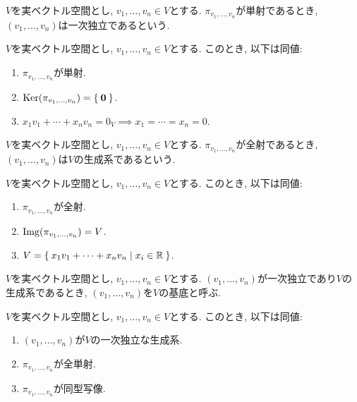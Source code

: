 \begin{definition}
  $V$を実ベクトル空間とし,
  $v_1,\ldots,v_n\in V$とする.
  $\pi_{v_1,\ldots,v_n}$が単射であるとき,
  $(v_1,\ldots,v_n)$は一次独立であるという.
\end{definition}
\begin{remark}
  $V$を実ベクトル空間とし,
  $v_1,\ldots,v_n\in V$とする.
  このとき, 以下は同値:
  \begin{enumerate}
  \item $\pi_{v_1,\ldots,v_n}$が単射.
  \item $\operatorname{Ker}(\pi_{v_1,\ldots,v_n})=\Set{\boldsymbol{0}}$.
  \item $x_1v_1+\cdots+x_nv_n=0_V \implies x_1=\cdots=x_n=0$.
  \end{enumerate}
\end{remark}

\begin{definition}
  $V$を実ベクトル空間とし,
  $v_1,\ldots,v_n\in V$とする.
  $\pi_{v_1,\ldots,v_n}$が全射であるとき,
  $(v_1,\ldots,v_n)$は$V$の生成系であるという.
\end{definition}
\begin{remark}
  $V$を実ベクトル空間とし,
  $v_1,\ldots,v_n\in V$とする.
  このとき, 以下は同値:
  \begin{enumerate}
  \item $\pi_{v_1,\ldots,v_n}$が全射.
  \item $\operatorname{Img}(\pi_{v_1,\ldots,v_n})=V$.
  \item $V=\Set{x_1v_1+\cdots+x_nv_n|x_i\in \mathbb{R}}$.
  \end{enumerate}
\end{remark}

\begin{definition}
  $V$を実ベクトル空間とし,
  $v_1,\ldots,v_n\in V$とする.
  $(v_1,\ldots,v_n)$が一次独立であり$V$の生成系であるとき,
  $(v_1,\ldots,v_n)$を$V$の基底と呼ぶ.
\end{definition}
\begin{remark}
  $V$を実ベクトル空間とし,
  $v_1,\ldots,v_n\in V$とする.
  このとき, 以下は同値:
  \begin{enumerate}
  \item $(v_1,\ldots,v_n)$が$V$の一次独立な生成系.
  \item $\pi_{v_1,\ldots,v_n}$が全単射.
  \item $\pi_{v_1,\ldots,v_n}$が同型写像.
  \end{enumerate}
\end{remark}


